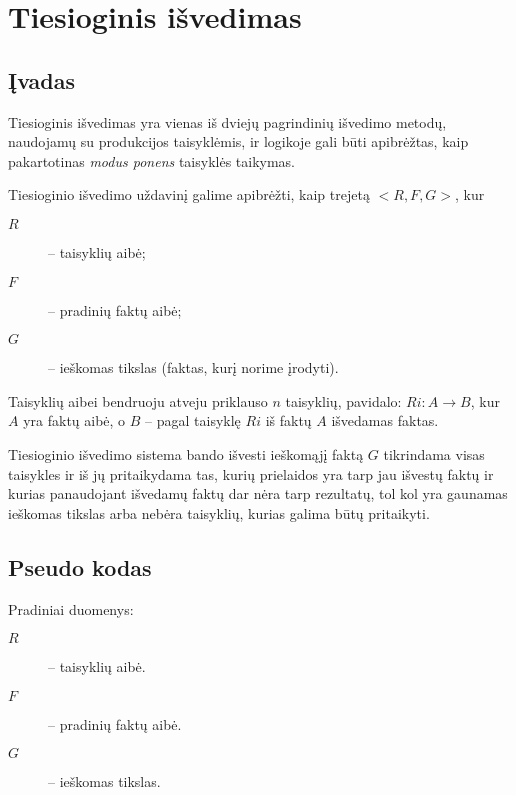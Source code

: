 \chapter{Tiesioginis išvedimas}

\section{Įvadas}

Tiesioginis išvedimas yra vienas iš dviejų pagrindinių išvedimo metodų,
naudojamų su produkcijos taisyklėmis, ir logikoje gali būti
apibrėžtas, kaip pakartotinas \emph{modus ponens} taisyklės
taikymas.

Tiesioginio išvedimo uždavinį galime apibrėžti, kaip trejetą
$<R, F, G>$, kur
\begin{description}
  \item[$R$] – taisyklių aibė;
  \item[$F$] – pradinių faktų aibė;
  \item[$G$] – ieškomas tikslas (faktas, kurį norime įrodyti).
\end{description}
Taisyklių aibei bendruoju atveju priklauso $n$ taisyklių, pavidalo:
$Ri: A \to B$, kur $A$ yra faktų aibė, o $B$ – pagal taisyklę
$Ri$ iš faktų $A$ išvedamas faktas.

Tiesioginio išvedimo sistema bando išvesti ieškomąjį faktą $G$
tikrindama visas taisykles ir iš jų pritaikydama tas, kurių
prielaidos yra tarp jau išvestų faktų ir kurias panaudojant išvedamų
faktų dar nėra tarp rezultatų, tol kol yra gaunamas ieškomas tikslas
arba nebėra taisyklių, kurias galima būtų pritaikyti.

\section{Pseudo kodas}

\label{sec:fc:pseudo}

Pradiniai duomenys:
\begin{description}
  \item[$R$] – taisyklių aibė.
  \item[$F$] – pradinių faktų aibė.
  \item[$G$] – ieškomas tikslas.
\end{description}

